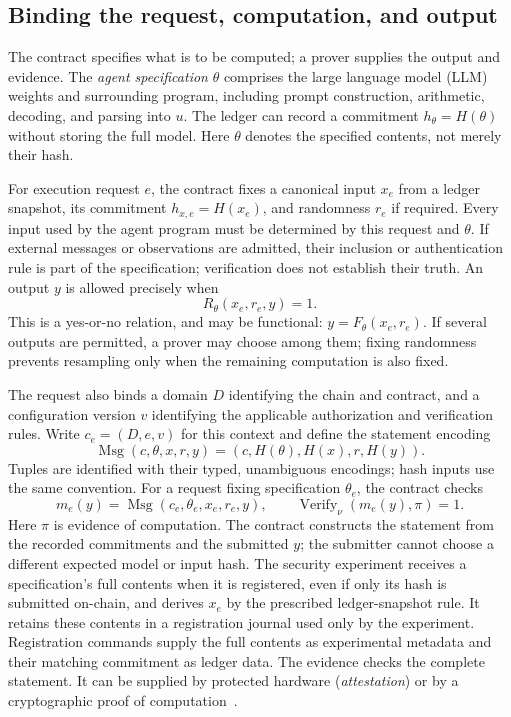 \documentclass[10pt,letterpaper]{article}
\newcommand{\Verify}{\operatorname{Verify}}
\newcommand{\Msg}{\operatorname{Msg}}
\begin{document}
\subsection{Binding the request, computation, and output}
The contract specifies what is to be computed; a prover supplies the output and evidence. The \emph{agent specification} $\theta$ comprises the large language model (LLM) weights and surrounding program, including prompt construction, arithmetic, decoding, and parsing into $u$. The ledger can record a commitment $h_\theta=H(\theta)$ without storing the full model. Here $\theta$ denotes the specified contents, not merely their hash.

For execution request $e$, the contract fixes a canonical input $x_e$ from a ledger snapshot, its commitment $h_{x,e}=H(x_e)$, and randomness $r_e$ if required. Every input used by the agent program must be determined by this request and $\theta$. If external messages or observations are admitted, their inclusion or authentication rule is part of the specification; verification does not establish their truth. An output $y$ is allowed precisely when
\begin{equation}
 R_\theta(x_e,r_e,y)=1. \label{eq:relation}
\end{equation}
This is a yes-or-no relation, and may be functional: $y=F_\theta(x_e,r_e)$. If several outputs are permitted, a prover may choose among them; fixing randomness prevents resampling only when the remaining computation is also fixed.

The request also binds a domain $D$ identifying the chain and contract, and a configuration version $v$ identifying the applicable authorization and verification rules. Write $c_e=(D,e,v)$ for this context and define the statement encoding
\[
 \Msg(c,\theta,x,r,y)=(c,H(\theta),H(x),r,H(y)).
\]
Tuples are identified with their typed, unambiguous encodings; hash inputs use the same convention. For a request fixing specification $\theta_e$, the contract checks
\begin{equation}
 m_e(y)=\Msg(c_e,\theta_e,x_e,r_e,y),\qquad
 \Verify_\nu(m_e(y),\pi)=1. \label{eq:verify}
\end{equation}
Here $\pi$ is evidence of computation. The contract constructs the statement from the recorded commitments and the submitted $y$; the submitter cannot choose a different expected model or input hash. The security experiment receives a specification's full contents when it is registered, even if only its hash is submitted on-chain, and derives $x_e$ by the prescribed ledger-snapshot rule. It retains these contents in a registration journal used only by the experiment. Registration commands supply the full contents as experimental metadata and their matching commitment as ledger data. The evidence checks the complete statement. It can be supplied by protected hardware (\emph{attestation}) or by a cryptographic proof of computation~\citep{gennaro2010}.
\end{document}
